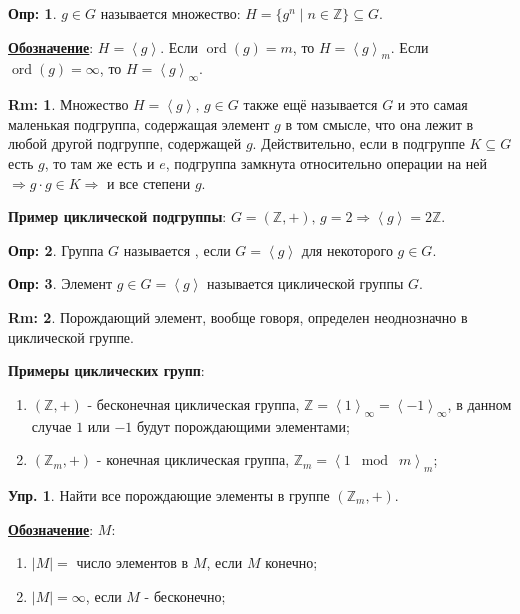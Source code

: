 \documentclass[12pt]{article}
\newcommand{\MZ}{\mathbb{Z}}
\theoremstyle{definition}
\newtheorem{defn}{Опр:}
\newtheorem{rem}{Rm:}
\newtheorem{exrc}{Упр.}
\newcommand{\linsp}[1]{\left\langle #1 \right\rangle }
\DeclareMathOperator\ord{ord}
\begin{document}
\begin{defn}
	 $g \in G$ называется множество: $H = \{g^n \mid n \in \MZ\} \subseteq G$.
\end{defn}
\textbf{\uline{Обозначение}}: $H = \linsp{g}$. Если $\ord(g) = m$, то $H = \linsp{g}_m$. Если $\ord(g) = \infty$, то $H = \linsp{g}_{\infty}$.
\begin{rem}
	Множество $H = \linsp{g}, \, g \in G$ также ещё называется  $G$ и это самая маленькая подгруппа, содержащая элемент $g$ в том смысле, что она лежит в любой другой подгруппе, содержащей $g$. Действительно, если в подгруппе $K \subseteq G$ есть $g$, то там же есть и $e$, подгруппа замкнута относительно операции на ней $\Rightarrow g{\cdot}g \in K \Rightarrow$ и все степени $g$.
\end{rem}
\textbf{Пример циклической подгруппы}: $G = (\MZ, +), \, g = 2 \Rightarrow \linsp{g} = 2\MZ$.
\begin{defn}
	Группа $G$ называется , если $G = \linsp{g}$ для некоторого $g \in G$.
\end{defn}
\begin{defn}
	Элемент $g \in G = \linsp{g}$ называется  циклической группы $G$. 
\end{defn}
\begin{rem}
	Порождающий элемент, вообще говоря, определен неоднозначно в циклической группе.
\end{rem}
\newpage
\textbf{Примеры циклических групп}:
\begin{enumerate}[label=\arabic*)]
	\item $(\MZ,+)$ - бесконечная циклическая группа, $\MZ = \linsp{1}_\infty = \linsp{-1}_\infty$, в данном случае $1$ или $-1$ будут порождающими элементами;
	 \item $(\MZ_m, +)$ - конечная циклическая группа, $\MZ_m = \linsp{1 \; \bmod \; m}_m$;
\end{enumerate}
\begin{exrc}
	Найти все порождающие элементы в группе $(\MZ_m,+)$.
\end{exrc}
\textbf{\uline{Обозначение}}:  $M$: 
\begin{enumerate}[label=(\arabic*)]
	\item $|M| = $ число элементов в $M$, если $M$ конечно;
	\item $|M| = \infty$, если $M$ - бесконечно;
\end{enumerate}
\end{document}
